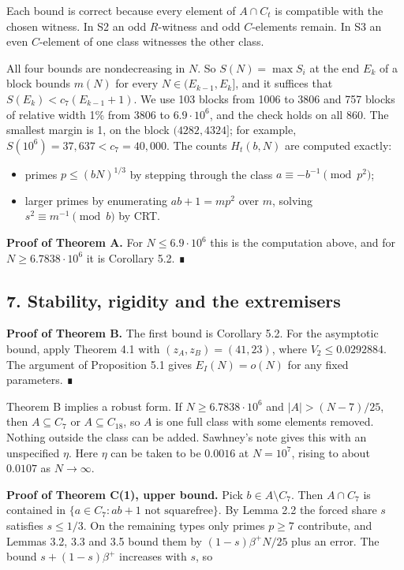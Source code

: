 \documentclass[
  11pt,
]{article}
\providecommand{\tightlist}{%
  \setlength{\itemsep}{0pt}\setlength{\parskip}{0pt}}
\begin{document}
Each bound is correct because every element of \(A \cap C_t\) is
compatible with the chosen witness. In S2 an odd \(R\)-witness and odd
\(C\)-elements remain. In S3 an even \(C\)-element of one class
witnesses the other class.

All four bounds are nondecreasing in \(N\). So \(S(N) = \max S_i\) at
the end \(E_k\) of a block bounds \(m(N)\) for every
\(N \in (E_{k-1}, E_k]\), and it suffices that
\(S(E_k) < c_7(E_{k-1} + 1)\). We use 103 blocks from 1006 to 3806 and
757 blocks of relative width 1\% from 3806 to \(6.9\cdot 10^{6}\), and
the check holds on all 860. The smallest margin is 1, on the block
\((4282, 4324]\); for example,
\(S(10^{6}) = 37{,}637 < c_7 = 40{,}000\). The counts \(H_t(b, N)\) are
computed exactly:

\begin{itemize}
\tightlist
\item
  primes \(p \le (bN)^{1/3}\) by stepping through the class
  \(a \equiv -b^{-1} \pmod{p^2}\);
\item
  larger primes by enumerating \(ab + 1 = mp^2\) over \(m\), solving
  \(s^2 \equiv m^{-1} \pmod{b}\) by CRT.
\end{itemize}

\textbf{Proof of Theorem A.} For \(N \le 6.9\cdot 10^{6}\) this is the
computation above, and for \(N \ge 6.7838\cdot 10^{6}\) it is Corollary
5.2. ∎

\subsection{7. Stability, rigidity and the extremisers}

\textbf{Proof of Theorem B.} The first bound is Corollary 5.2. For the
asymptotic bound, apply Theorem 4.1 with \((z_A, z_B) = (41, 23)\),
where \(V_2 \le 0.0292884\). The argument of Proposition 5.1 gives
\(E_I(N) = o(N)\) for any fixed parameters. ∎

Theorem B implies a robust form. If \(N \ge 6.7838\cdot 10^{6}\) and
\(|A| > (N - 7)/25\), then \(A \subseteq C_7\) or
\(A \subseteq C_{18}\), so \(A\) is one full class with some elements
removed. Nothing outside the class can be added. Sawhney's note gives
this with an unspecified \(\eta\). Here \(\eta\) can be taken to be
\(0.0016\) at \(N = 10^{7}\), rising to about \(0.0107\) as
\(N \to \infty\).

\textbf{Proof of Theorem C(1), upper bound.} Pick
\(b \in A \setminus C_7\). Then \(A \cap C_7\) is contained in
\(\{a \in C_7 : ab + 1 \text{ not squarefree}\}\). By Lemma 2.2 the
forced share \(s\) satisfies \(s \le 1/3\). On the remaining types only
primes \(p \ge 7\) contribute, and Lemmas 3.2, 3.3 and 3.5 bound them by
\((1 - s)\beta^{+}N/25\) plus an error. The bound
\(s + (1 - s)\beta^{+}\) increases with \(s\), so
\end{document}
